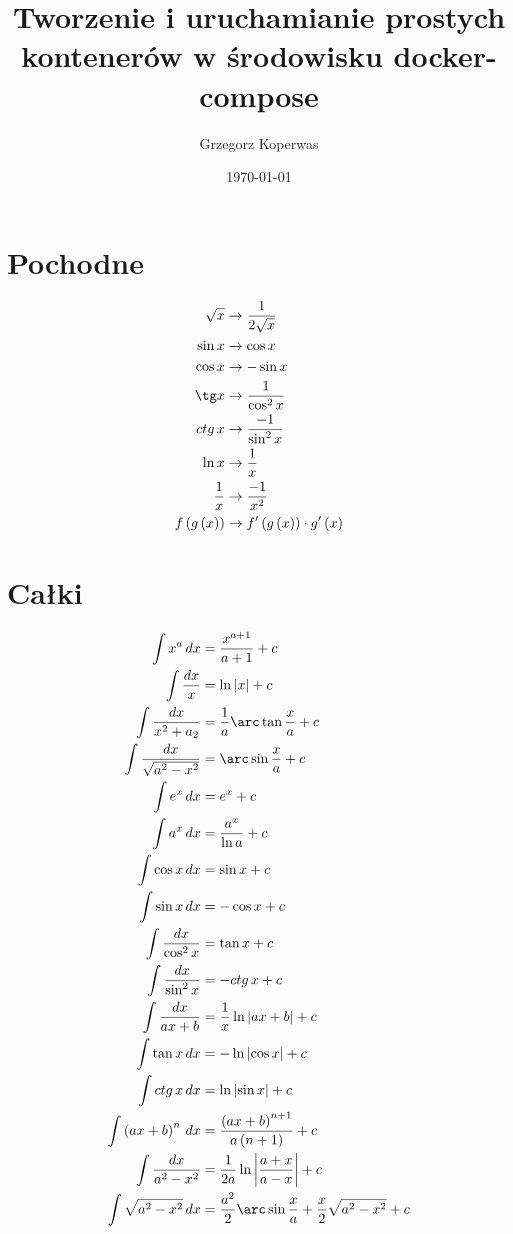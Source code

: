 \documentclass[a4paper,12pt]{article}
\title{Tworzenie i uruchamianie prostych kontenerów w środowisku  docker-compose}
\author{Grzegorz Koperwas}
\date{\today}
\begin{document}
\begin{multicols}{2}
    \section{Pochodne}
    \begin{align*}
        \sqrt{x} &\rightarrow \frac{1}{2 \sqrt{x}}\\
        \sin x &\rightarrow \cos x\\
        \cos x &\rightarrow - \sin x\\
        \tg x &\rightarrow \frac{1}{\cos^2 x}\\
        ctg\, x &\rightarrow \frac{ -1}{\sin^2 x}\\
        \ln x &\rightarrow \frac{1}{x}\\
        \frac{1}{x} &\rightarrow \frac{ - 1}{x^2}\\
        f \left(g \left(x\right)\right) &\rightarrow f'\left(g\left(x\right)\right) \cdot g'\left(x\right)
    \end{align*}
    \section{Całki}
    \begin{align*}
        \int x^a\, dx &= \frac{x^{a + 1}}{a + 1} + c \\
        \int \frac{dx}{x} &= \ln \left| x \right| + c \\
        \int \frac{dx}{x^2 + a_2} &= \frac{1}{a} \arc\tan \frac{x}{a} + c \\
        \int \frac{dx}{\sqrt{a^2 - x^2}} &= \arc\sin \frac{x}{a} + c \\
        \int e^x\, dx &= e^x + c \\
        \int a^x\, dx &= \frac{a^x}{\ln a} + c \\ 
        \int \cos x\, dx &= \sin x + c \\
        \int \sin x\, dx &= - \cos x + c \\
        \int \frac{dx}{\cos^{2} x} &= \tan x + c \\
        \int \frac{dx}{\sin^{2} x} &= - ctg\,  x + c \\
        \int \frac{dx}{ax + b} &= \frac{1}{x} \ln \left| ax + b \right| + c \\
        \int \tan x\, dx &= -\ln \left| \cos x \right| + c \\
        \int ctg\,  x\, dx &= \ln \left| \sin x \right| + c \\
        \int \left(ax + b\right)^n\, dx &= \frac{\left(ax + b\right)^{n + 1}}{a\left(n + 1\right)} + c \\
        \int \frac{dx}{a^2 - x^2} &= \frac{1}{2a} \ln \left| \frac{a + x}{a - x} \right| + c \\
        \int \sqrt{a^2 - x^2}\, dx &= \frac{a^2}{2} \arc\sin \frac{x}{a} + \frac{x}{2}\sqrt{a^2 - x^2} + c
    \end{align*}

\end{multicols}
\end{document}
